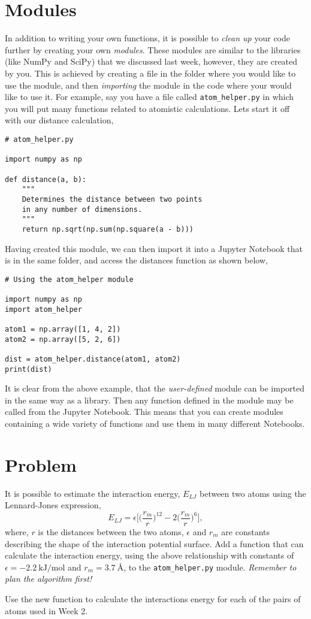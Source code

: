 \documentclass[a4paper]{article}
\begin{document}
\section{Modules}

In addition to writing your own functions, it is possible to \emph{clean up} your code further by creating your own \emph{modules}.
These modules are similar to the libraries (like NumPy and SciPy) that we discussed last week, however, they are created by you.
This is achieved by creating a file in the folder where you would like to use the module, and then \emph{importing} the module in the code where your would like to use it.
For example, say you have a file called \texttt{atom\_helper.py} in which you will put many functions related to atomistic calculations.
Lets start it off with our distance calculation,
\begin{lstlisting}
# atom_helper.py

import numpy as np

def distance(a, b):
    """
    Determines the distance between two points
    in any number of dimensions.
    """
    return np.sqrt(np.sum(np.square(a - b)))
\end{lstlisting}
Having created this module, we can then import it into a Jupyter Notebook that is in the same folder, and access the distances function as shown below,
\begin{lstlisting}
# Using the atom_helper module

import numpy as np
import atom_helper

atom1 = np.array([1, 4, 2])
atom2 = np.array([5, 2, 6])

dist = atom_helper.distance(atom1, atom2)
print(dist)
\end{lstlisting}
It is clear from the above example, that the \emph{user-defined} module can be imported in the same way as a library.
Then any function defined in the module may be called from the Jupyter Notebook.
This means that you can create modules containing a wide variety of functions and use them in many different Notebooks.

\section{Problem}

It is possible to estimate the interaction energy, $E_{LJ}$ between two atoms using the Lennard-Jones expression,
\begin{equation}
  E_{LJ} = \epsilon \bigg[\Big(\frac{r_m}{r}\Big)^{12} - 2\Big(\frac{r_m}{r}\Big)^6\bigg],
\end{equation}
where, $r$ is the distances between the two atoms, $\epsilon$ and $r_m$ are constants describing the shape of the interaction potential surface.
Add a function that can calculate the interaction energy, using the above relationship with constants of $\epsilon = \SI{-2.2}{\kilo\joule\per\mol}$ and $r_m = \SI{3.7}{\angstrom}$, to the \texttt{atom\_helper.py} module.
\emph{Remember to plan the algorithm first!}

Use the new function to calculate the interactions energy for each of the pairs of atoms used in Week 2.

%
%
\end{document}
